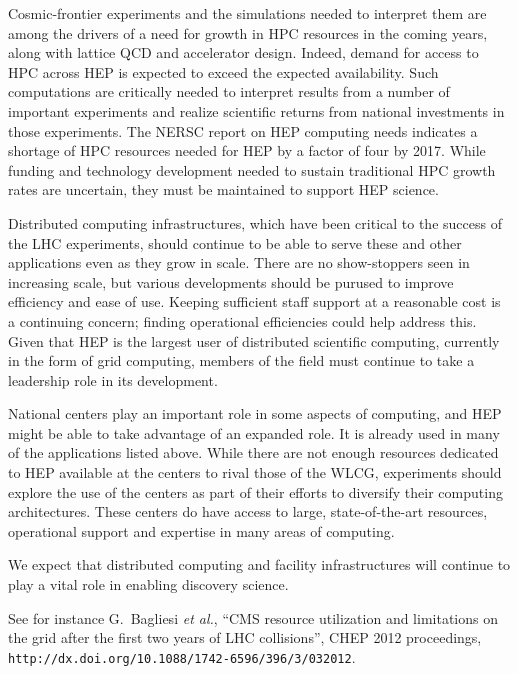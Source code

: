 Cosmic-frontier experiments and the simulations needed to interpret them are among the drivers of a need for growth in HPC resources in the coming years, along with lattice QCD and accelerator design.  Indeed, demand for access to HPC across HEP is expected to exceed the expected availability.  
Such computations are critically needed to interpret results from a number of important experiments and realize scientific returns from national investments in those experiments.  The NERSC report on HEP computing needs indicates a shortage of HPC resources needed for HEP by a factor of four by 2017.  While funding and technology development needed to sustain traditional HPC growth rates are uncertain, they must be maintained to support HEP science.

Distributed computing infrastructures, which have been critical to the success of the LHC experiments, should continue to be able to serve these and other applications even as they grow in scale.  There are no show-stoppers seen in increasing scale, but various developments should be purused to improve efficiency and ease of use.  Keeping sufficient staff support at a reasonable cost is a continuing concern; finding operational efficiencies could help address this.  Given that HEP is the largest user of distributed scientific computing, currently in the form of grid computing, members of the field must continue to take a leadership role in its development.

National centers play an important role in some aspects of computing, and HEP might be able to take advantage of an expanded role.  It is already used in many of the applications listed above.  While there are not enough resources dedicated to HEP available at the centers to rival those of the WLCG, experiments should explore the use of the centers as part of their efforts to diversify their computing architectures.  These centers do have access to large, state-of-the-art resources, operational support and expertise in many areas of computing.

We expect that distributed computing and facility infrastructures will continue to play a vital role in enabling discovery science.


\begin{thebibliography}{99}
 See for instance G.~Bagliesi {\it et al.}, ``CMS resource utilization and limitations on the grid after the first two years of LHC collisions'', CHEP 2012 proceedings, {\tt http://dx.doi.org/10.1088/1742-6596/396/3/032012}.
\end{thebibliography}


